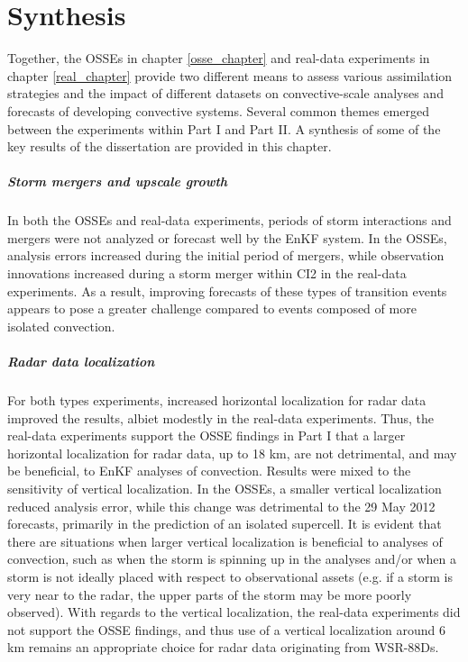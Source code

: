 \chapter{Synthesis}

Together, the OSSEs in chapter \ref{osse_chapter} and real-data experiments in chapter \ref{real_chapter} provide two different means to assess various assimilation strategies and the impact of different datasets on convective-scale analyses and forecasts of developing convective systems. Several common themes emerged between the experiments within Part I and Part II. A synthesis of some of the key results of the dissertation are provided in this chapter.

\paragraph{Storm mergers and upscale growth}
In both the OSSEs and real-data experiments, periods of storm interactions and mergers were not analyzed or forecast well by the EnKF system. In the OSSEs, analysis errors increased during the initial period of mergers, while observation innovations increased during a storm merger within CI2 in the real-data experiments. As a result, improving forecasts of these types of transition events appears to pose a greater challenge compared to events composed of more isolated convection.

\paragraph{Radar data localization}
For both types experiments, increased horizontal localization for radar data improved the results, albiet modestly in the real-data experiments. Thus, the real-data experiments support the OSSE findings in Part I that a larger horizontal localization for radar data, up to 18 km, are not detrimental, and may be beneficial, to EnKF analyses of convection. Results were mixed to the sensitivity of vertical localization. In the OSSEs, a smaller vertical localization reduced analysis error, while this change was detrimental to the 29 May 2012 forecasts, primarily in the prediction of an isolated supercell. It is evident that there are situations when larger vertical localization is beneficial to analyses of convection, such as when the storm is spinning up in the analyses and/or when a storm is not ideally placed with respect to observational assets (e.g. if a storm is very near to the radar, the upper parts of the storm may be more poorly observed). With regards to the vertical localization, the real-data experiments did not support the OSSE findings, and thus use of a vertical localization around 6 km remains an appropriate choice for radar data originating from WSR-88Ds.

